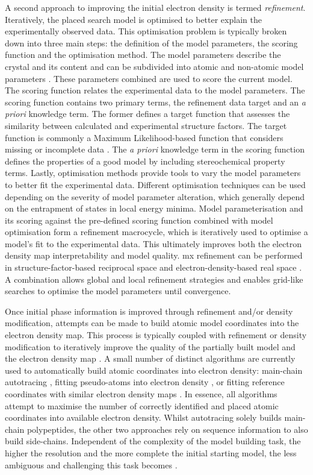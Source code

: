 A second approach to improving the initial electron density is termed \textit{refinement}. Iteratively, the placed search model is optimised to better explain the experimentally observed data. This optimisation problem is typically broken down into three main steps: the definition of the model parameters, the scoring function and the optimisation method. The model parameters describe the crystal and its content and can be subdivided into atomic and non-atomic model parameters \cite{Afonine2012-bg}. These parameters combined are used to score the current model. The scoring function relates the experimental data to the model parameters. The scoring function contains two primary terms, the refinement data target and an \textit{a priori} knowledge term. The former defines a target function that assesses the similarity between calculated and experimental structure factors. The target function is commonly a Maximum Likelihood-based function that considers missing or incomplete data \cite{Murshudov2011-ww,Afonine2012-bg}. The \textit{a priori} knowledge term in the scoring function defines the properties of a good model by including stereochemical property terms. Lastly, optimisation methods provide tools to vary the model parameters to better fit the experimental data. Different optimisation techniques can be used depending on the severity of model parameter alteration, which generally depend on the entrapment of states in local energy minima. Model parameterisation and its scoring against the pre-defined scoring function combined with model optimisation form a refinement macrocycle, which is iteratively used to optimise a model's fit to the experimental data. This ultimately improves both the electron density map interpretability and model quality. \gls{mx} refinement can be performed in structure-factor-based reciprocal space and electron-density-based real space \cite{Afonine2012-bg}. A combination allows global and local refinement strategies and enables grid-like searches to optimise the model parameters until convergence.

Once initial phase information is improved through refinement and/or density modification, attempts can be made to build atomic model coordinates into the electron density map. This process is typically coupled with refinement or density modification to iteratively improve the quality of the partially built model and the electron density map \cite{Rupp2010-nc}. A small number of distinct algorithms are currently used to automatically build atomic coordinates into electron density: main-chain autotracing \cite{Sheldrick2010-cx}, fitting pseudo-atoms into electron density \cite{Lamzin2001-cn}, or fitting reference coordinates with similar electron density maps \cite{Terwilliger2004-ig,Cowtan2006-xv}. In essence, all algorithms attempt to maximise the number of correctly identified and placed atomic coordinates into available electron density. Whilst autotracing solely builds main-chain polypeptides, the other two approaches rely on sequence information to also build side-chains. Independent of the complexity of the model building task, the higher the resolution and the more complete the initial starting model, the less ambiguous and challenging this task becomes \cite{Rupp2010-nc}. 

